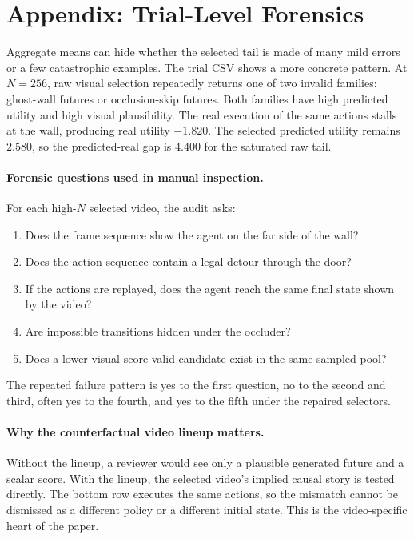 \documentclass{article}
\begin{document}
\section{Appendix: Trial-Level Forensics}
\label{app:trial-forensics}

Aggregate means can hide whether the selected tail is made of many mild errors or a few catastrophic examples. The trial CSV shows a more concrete pattern. At \(N=256\), raw visual selection repeatedly returns one of two invalid families: ghost-wall futures or occlusion-skip futures. Both families have high predicted utility and high visual plausibility. The real execution of the same actions stalls at the wall, producing real utility \(-1.820\). The selected predicted utility remains \(2.580\), so the predicted-real gap is \(4.400\) for the saturated raw tail.

\paragraph{Forensic questions used in manual inspection.}
For each high-\(N\) selected video, the audit asks:
\begin{enumerate}
  \item Does the frame sequence show the agent on the far side of the wall?
  \item Does the action sequence contain a legal detour through the door?
  \item If the actions are replayed, does the agent reach the same final state shown by the video?
  \item Are impossible transitions hidden under the occluder?
  \item Does a lower-visual-score valid candidate exist in the same sampled pool?
\end{enumerate}
The repeated failure pattern is yes to the first question, no to the second and third, often yes to the fourth, and yes to the fifth under the repaired selectors.

\paragraph{Why the counterfactual video lineup matters.}
Without the lineup, a reviewer would see only a plausible generated future and a scalar score. With the lineup, the selected video's implied causal story is tested directly. The bottom row executes the same actions, so the mismatch cannot be dismissed as a different policy or a different initial state. This is the video-specific heart of the paper.
\end{document}
